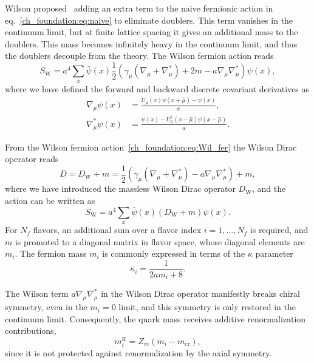 Wilson proposed~\cite{Wilson:1974sk} adding an extra term to the naive fermionic action in eq.~\eqref{ch_foundation:eq:naive} to eliminate doublers. This term vanishes in the continuum limit, but at finite lattice spacing it gives an additional mass to the doublers. This mass becomes infinitely heavy in the continuum limit, and thus the doublers decouple from the theory. The Wilson fermion action reads
\begin{equation}
\label{ch_foundation:eq:Wil_fer}
S_{\textrm{W}}=a^4\sum_x\bar{\psi}(x)\frac{1}{2}\left(\gamma_{\mu}\left(\nabla_{\mu}+\nabla_{\mu}^*\right)+2m-a\nabla_{\mu}\nabla_{\mu}^*\right)\psi(x),
\end{equation}
where we have defined the forward and backward discrete covariant derivatives as
\begin{align}
\nabla_{\mu}\psi(x)&=\frac{U_{\mu}(x)\psi(x+\hat{\mu})-\psi(x)}{a},\\
\nabla_{\mu}^*\psi(x)&=\frac{\psi(x)-U_{\mu}^{\dagger}(x-\hat{\mu})\psi(x-\hat{\mu})}{a}.
\end{align}

From the Wilson fermion action~\eqref{ch_foundation:eq:Wil_fer} the Wilson Dirac operator reads
\begin{equation}
\label{ch_foundation:eq:DW}
D=D_{\textrm{W}}+m=\frac{1}{2}\left(\gamma_{\mu}\left(\nabla_{\mu}+\nabla_{\mu}^*\right)-a\nabla_{\mu}\nabla_{\mu}^*\right)+m,
\end{equation}
where we have introduced the massless Wilson Dirac operator $D_{\textrm{W}}$, and the action can be written as
\begin{equation}
S_{\textrm{W}}=a^4\sum_x\bar{\psi}(x)\left(D_{\textrm{W}}+m\right)\psi(x).
\end{equation}
For $N_f$ flavors, an additional sum over a flavor index $i=1,...,N_f$ is required, and $m$ is promoted to a diagonal matrix in flavor space, whose diagonal elements are $m_i$. The fermion mass $m_i$ is commonly expressed in terms of the $\kappa$ parameter
\begin{equation}
\label{ch_foundation:eq:kappa}
\kappa_i=\frac{1}{2am_i+8}.
\end{equation}

The Wilson term $a\nabla_{\mu}\nabla_{\mu}^*$ in the Wilson Dirac operator manifestly breaks chiral symmetry, even in the $m_i=0$ limit, and this symmetry is only restored in the continuum limit. Consequently, the quark mass receives additive renormalization contributions, 
\begin{equation}
m_i^{\textrm{R}}=Z_m\left(m_i-m_{\textrm{cr}}\right),
\end{equation}
since it is not protected against renormalization by the axial symmetry.

